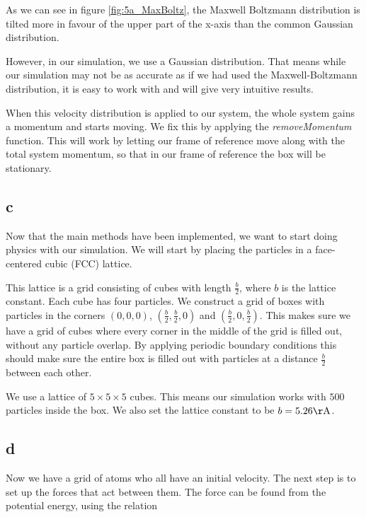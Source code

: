 \documentclass[10pt,showpacs,preprintnumbers,footinbib,amsmath,amssymb,aps,prl,twocolumn,groupedaddress,superscriptaddress,showkeys]{revtex4-1}
\begin{document}
As we can see in figure \ref{fig:5a_MaxBoltz}, the Maxwell Boltzmann distribution is tilted more in favour of the upper part of the x-axis than the common Gaussian distribution.

However, in our simulation, we use a Gaussian distribution. That means while our simulation may not be as accurate as if we had used the Maxwell-Boltzmann distribution, it is easy to work with and will give very intuitive results.

When this velocity distribution is applied to our system, the whole system gains a momentum and starts moving. We fix this by applying the \textit{removeMomentum} function. This will work by letting our frame of reference move along with the total system momentum, so that in our frame of reference the box will be stationary.

\subsection*{c}

Now that the main methods have been implemented, we want to start doing physics with our simulation. We will start by placing the particles in a face-centered cubic (FCC) lattice.


This lattice is a grid consisting of cubes with length $\frac{b}{2}$, where $b$ is the lattice constant. Each cube has four particles. We construct a grid of boxes with particles in the corners $\left(0,0,0  \right)$, $\left(\frac{b}{2}, \frac{b}{2}, 0  \right)$ and $\left( \frac{b}{2}, 0, \frac{b}{2}  \right)$. This makes sure we have a grid of cubes where every corner in the middle of the grid is filled out, without any particle overlap. By applying periodic boundary conditions this should make sure the entire box is filled out with particles at a distance $\frac{b}{2}$ between each other.


We use a lattice of $5 \times 5 \times 5$ cubes. This means our simulation works with $500$ particles inside the box. We also set the lattice constant to be $b = 5.26\mathrm{\AA}$.

\subsection*{d}

Now we have a grid of atoms who all have an initial velocity. The next step is to set up the forces that act between them. The force can be found from the potential energy, using the relation
\end{document}
